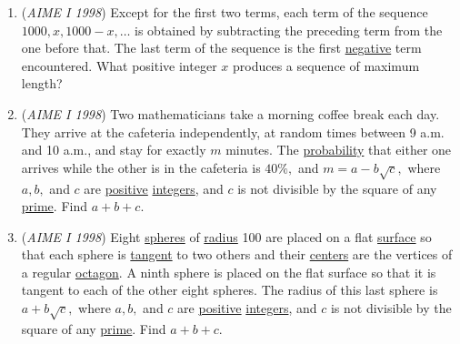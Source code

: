 \begin{enumerate}
	\item (\textit{AIME I 1998}) Except for the first two terms, each term of the sequence $1000, x, 1000 - x,\ldots$ is obtained by subtracting the preceding term from the one before that.  The last term of the sequence is the first \href{https://artofproblemsolving.com/wiki/index.php?title=Negative}{negative} term encountered.  What positive integer $x$ produces a sequence of maximum length?


 

	\item (\textit{AIME I 1998}) Two mathematicians take a morning coffee break each day.  They arrive at the cafeteria independently, at random times between 9 a.m. and 10 a.m., and stay for exactly $m$ minutes.  The \href{https://artofproblemsolving.com/wiki/index.php?title=Probability}{probability} that either one arrives while the other is in the cafeteria is $40 \%,$ and $m = a - b\sqrt {c},$ where $a, b,$ and $c$ are \href{https://artofproblemsolving.com/wiki/index.php?title=Positive}{positive} \href{https://artofproblemsolving.com/wiki/index.php?title=Integer}{integers}, and $c$ is not divisible by the square of any \href{https://artofproblemsolving.com/wiki/index.php?title=Prime}{prime}.  Find $a + b + c.$


	\item (\textit{AIME I 1998}) Eight \href{https://artofproblemsolving.com/wiki/index.php?title=Sphere}{spheres} of \href{https://artofproblemsolving.com/wiki/index.php?title=Radius}{radius} 100 are placed on a flat \href{https://artofproblemsolving.com/wiki/index.php?title=Plane}{surface} so that each sphere is \href{https://artofproblemsolving.com/wiki/index.php?title=Tangent}{tangent} to two others and their \href{https://artofproblemsolving.com/wiki/index.php?title=Center}{centers} are the vertices of a regular \href{https://artofproblemsolving.com/wiki/index.php?title=Octagon}{octagon}.  A ninth sphere is placed on the flat surface so that it is tangent to each of the other eight spheres.  The radius of this last sphere is $a +b\sqrt {c},$ where $a, b,$ and $c$ are \href{https://artofproblemsolving.com/wiki/index.php?title=Positive}{positive} \href{https://artofproblemsolving.com/wiki/index.php?title=Integer}{integers}, and $c$ is not divisible by the square of any \href{https://artofproblemsolving.com/wiki/index.php?title=Prime}{prime}.  Find $a + b + c$.


 


\end{enumerate}
